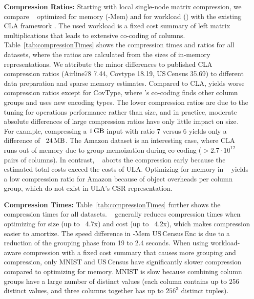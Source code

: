 \textbf{Compression Ratios:} Starting with local single-node matrix compression, we compare \name~ optimized for memory (\name-Mem) and for workload (\name) with the existing CLA framework \cite{ElgoharyBHRR16,ElgoharyBHRR18}. The used workload is a fixed cost summary of left matrix multiplications that leads to extensive co-coding of columns. Table~\ref{tab:compressionTimes} shows the compression times and ratios for all datasets, where the ratios are calculated from the sizes of in-memory representations.
We attribute the minor differences to published CLA compression ratios \cite{ElgoharyBHRR18} (Airline78 7.44, Covtype 18.19, US\,Census 35.69) to different data preparation and sparse memory estimates.
Compared to CLA, \name yields worse compression ratios except for CovType, where \name's co-coding finds other column groups and uses new encoding types.
The lower compression ratios are due to the tuning for operations performance rather than size, and in practice, moderate absolute differences of large compression ratios have only little impact on size.
For example, compressing a $1\gb$ input with ratio 7 versus 6 yields only a difference of ~$24\mb$.
The Amazon dataset is an interesting case, where CLA runs out of memory due to group memoization during co-coding ($>2.7\cdot10^{12}$ pairs of columns). In contrast, \name~ aborts the compression early because the estimated total costs exceed the costs of ULA. Optimizing for memory in \name~ yields a low compression ratio for Amazon because of object overheads per column group, which do not exist in ULA's CSR representation.

\textbf{Compression Times:}
Table~\ref{tab:compressionTimes} further shows the compression times for all datasets.
\name~ generally reduces compression times when optimizing for size (up to ~4.7x) and cost (up to ~4.2x), which makes compression easier to amortize.
The speed difference in \name-Mem US\,Census\,Enc is due to a reduction of the grouping phase from 19 to 2.4 seconds.
When using workload-aware compression with a fixed cost summary that causes more grouping and compression,
only MNIST and US\,Census have significantly slower compression compared to optimizing for memory.
MNIST is slow because combining column groups have a large number of distinct values (each column contains up to 256 distinct values, and three columns together has up to $256^3$ distinct tuples).

